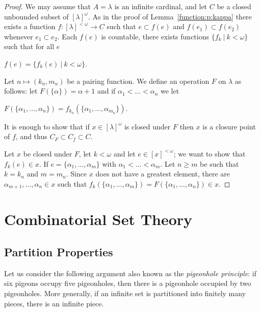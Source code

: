 \documentclass[8pt]{article}
\theoremstyle{definition}
\theoremstyle{definition}
\theoremstyle{definition}
\theoremstyle{definition}
\theoremstyle{definition}
\theoremstyle{definition}
\theoremstyle{definition}
\theoremstyle{definition}
\theoremstyle{definition}
\theoremstyle{definition}
\theoremstyle{definition}
\theoremstyle{definition}
\theoremstyle{definition}
\theoremstyle{definition}
\theoremstyle{question}
\begin{document}
\begin{proof}
  We may assume that $A = \lambda$ is an infinite cardinal, and let $C$ be a closed unbounded
  subset of $[\lambda]^{\omega}$. As in the proof of Lemma~\ref{function:p:kappa} there exists
  a function $f : [\lambda]^{< \omega} \to C$ such that $e \subset f(e)$ and
  $f(e_1) \subset f(e_2)$ whenever $e_1 \subset e_2$. Each $f(e)$ is countable,
  there exists functions $\{ f_k \: | \: k < \omega\}$ such that for all $e$
  \begin{center}
    $f(e) = \{ f_k(e) \: | \: k < \omega \}$.
  \end{center}

  Let $n \mapsto (k_n, m_n)$ be a pairing function. We define an operation $F$ on $\lambda$ as follows:
  let $F(\{ \alpha\}) = \alpha + 1$ and if $\alpha_1 < \ldots < \alpha_n$ we let 
  \begin{center}
  $F(\{ \alpha_1, \ldots, \alpha_n\}) = f_{k_n} (\{ \alpha_1, \ldots, \alpha_{m_n} \})$.
  \end{center}
  It is enough to show that if $x \in [\lambda]^{\omega}$ is closed under $F$ then $x$ is a closure point
  of $f$, and thus $C_F \subset C_f \subset C$.

  Let $x$ be closed under $F$, let $k < \omega$ and let $e \in [x]^{< \omega}$; we want to
  show that $f_k(e) \in x$. If $e = \{ \alpha_1, \ldots, \alpha_m \}$ with $\alpha_1 < \ldots < \alpha_m$.
  Let $n \geq m$ be such that $k=k_n$ and $m = m_n$. Since $x$ does not have a greatest element, there are
  $\alpha_{m + 1}, \ldots, \alpha_n \in x$ such that 
  $f_k(\{ \alpha_1, \ldots, \alpha_m \})= F(\{ \alpha_1, \ldots, \alpha_n\}) \in x$.
\end{proof}

\section{Combinatorial Set Theory}

\subsection{Partition Properties}

Let us consider the following argument also known as the \emph{pigeonhole principle}:
if six pigeons occupy five pigeonholes, then there is a pigeonhole occupied by two pigeonholes.
More generally, if an infinite set is partitioned into finitely many pieces, there is an infinite piece.
\end{document}
